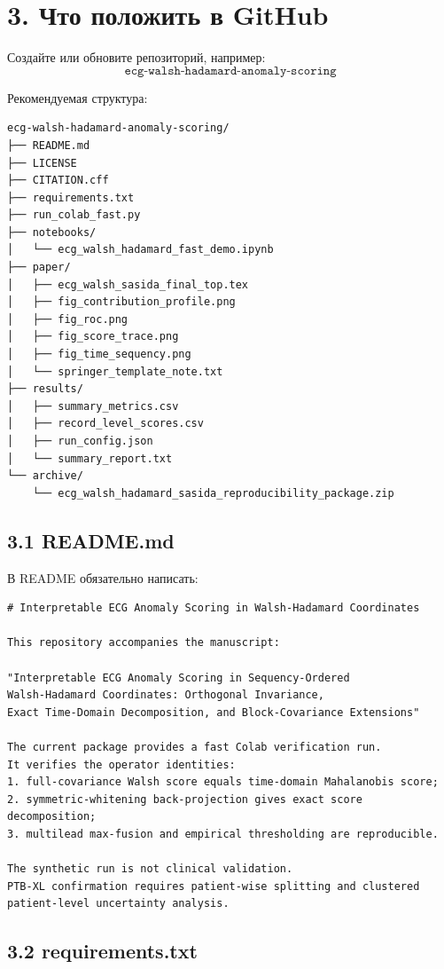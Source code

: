\documentclass[12pt,a4paper]{article}
\begin{document}
\section*{3. Что положить в GitHub}

Создайте или обновите репозиторий, например:
\[
\texttt{ecg-walsh-hadamard-anomaly-scoring}
\]

Рекомендуемая структура:

\begin{verbatim}
ecg-walsh-hadamard-anomaly-scoring/
├── README.md
├── LICENSE
├── CITATION.cff
├── requirements.txt
├── run_colab_fast.py
├── notebooks/
│   └── ecg_walsh_hadamard_fast_demo.ipynb
├── paper/
│   ├── ecg_walsh_sasida_final_top.tex
│   ├── fig_contribution_profile.png
│   ├── fig_roc.png
│   ├── fig_score_trace.png
│   ├── fig_time_sequency.png
│   └── springer_template_note.txt
├── results/
│   ├── summary_metrics.csv
│   ├── record_level_scores.csv
│   ├── run_config.json
│   └── summary_report.txt
└── archive/
    └── ecg_walsh_hadamard_sasida_reproducibility_package.zip
\end{verbatim}

\subsection*{3.1 README.md}

В README обязательно написать:

\begin{verbatim}
# Interpretable ECG Anomaly Scoring in Walsh-Hadamard Coordinates

This repository accompanies the manuscript:

"Interpretable ECG Anomaly Scoring in Sequency-Ordered
Walsh-Hadamard Coordinates: Orthogonal Invariance,
Exact Time-Domain Decomposition, and Block-Covariance Extensions"

The current package provides a fast Colab verification run.
It verifies the operator identities:
1. full-covariance Walsh score equals time-domain Mahalanobis score;
2. symmetric-whitening back-projection gives exact score decomposition;
3. multilead max-fusion and empirical thresholding are reproducible.

The synthetic run is not clinical validation.
PTB-XL confirmation requires patient-wise splitting and clustered
patient-level uncertainty analysis.
\end{verbatim}

\subsection*{3.2 requirements.txt}
\end{document}
